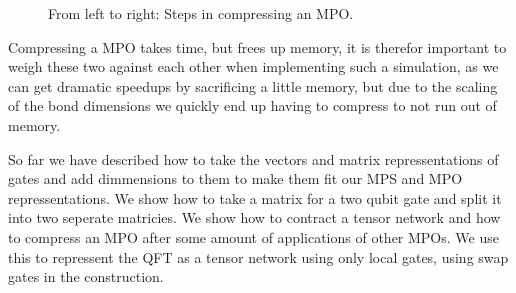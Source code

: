 \begin{figure}[H]
{
    }
    \caption{From left to right: Steps in compressing an MPO.}
    \label{fig:compress}
\end{figure}
\noindent 
Compressing a MPO takes time, but frees up memory, it is therefor important to weigh these two against each other when implementing such a simulation, as we can get dramatic speedups by sacrificing a little memory, but due to the scaling of the bond dimensions we quickly end up having to compress to not run out of memory. 

So far we have described how to take the vectors and matrix repressentations of gates and add dimmensions to them to make them fit our MPS and MPO repressentations. 
We show how to take a matrix for a two qubit gate and split it into two seperate matricies. 
We show how to contract a tensor network and how to compress an MPO after some amount of applications of other MPOs. 
We use this to repressent the QFT as a tensor network using only local gates, using swap gates in the construction.

